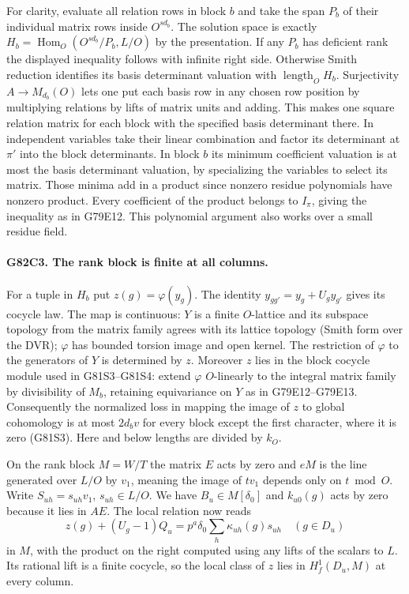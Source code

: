 For clarity, evaluate all relation rows in block $b$ and take the
span $P_b$ of their individual matrix rows inside $O^{sd_b}$.
The solution space is exactly
$H_b=\operatorname{Hom}_O(O^{sd_b}/P_b,L/O)$ by the presentation.
If any $P_b$ has deficient rank the displayed inequality follows
with infinite right side. Otherwise Smith reduction identifies its
basis determinant valuation with $\operatorname{length}_O H_b$.
Surjectivity $A\to M_{d_b}(O)$ lets one put each basis row in any
chosen row position by multiplying relations by lifts of matrix
units and adding. This makes one square relation matrix for each
block with the specified basis determinant there. In independent
variables take their linear combination and factor its determinant
at $\pi'$ into the block determinants. In block $b$ its minimum
coefficient valuation is at most the basis determinant valuation,
by specializing the variables to select its matrix. Those minima
add in a product since nonzero residue polynomials have nonzero
product. Every coefficient of the product belongs to $I_\pi$, giving
the inequality as in G79E12. This polynomial argument also works
over a small residue field.

\paragraph{G82C3. The rank block is finite at all columns.}
For a tuple in $H_b$ put $z(g)=\varphi(y_g)$. The identity
$y_{gg'}=y_g+U_g y_{g'}$ gives its cocycle law.
The map is continuous: $Y$ is a finite $O$-lattice and its
subspace topology from the matrix family agrees with its lattice
topology (Smith form over the DVR); $\varphi$ has bounded torsion
image and open kernel. The restriction of $\varphi$ to the
generators of $Y$ is determined by $z$. Moreover $z$ lies in the
block cocycle module used in G81S3--G81S4: extend $\varphi$
$O$-linearly to the integral matrix family by divisibility of
$M_b$, retaining equivariance on $Y$ as in G79E12--G79E13.
Consequently the normalized loss in mapping the image of $z$ to
global cohomology is at most $2d_b v$ for every block except the
first character, where it is zero (G81S3). Here and below lengths
are divided by $k_O$.

On the rank block $M=W/T$ the matrix $E$ acts by zero and $eM$
is the line generated over $L/O$ by $v_1$, meaning the image of
$t v_1$ depends only on $t\bmod O$. Write
$S_{uh}=s_{uh}v_1$, $s_{uh}\in L/O$. We have
$B_u\in M[\delta_0]$ and $k_{u0}(g)$ acts by zero because
it lies in $AE$. The local relation now reads
\[
 z(g)+(U_g-1)Q_u
       =p^a\delta_0\sum_h \kappa_{uh}(g)s_{uh}\quad(g\in D_u)
\]
in $M$, with the product on the right computed using any lifts of
the scalars to $L$. Its rational lift is a finite cocycle, so the
local class of $z$ lies in $H_f^1(D_u,M)$ at every column.

